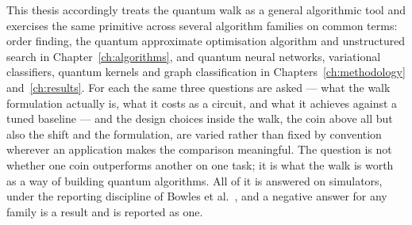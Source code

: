 This thesis accordingly treats the quantum walk as a general algorithmic
tool and exercises the same primitive across several algorithm families on
common terms: order finding, the quantum approximate optimisation algorithm
and unstructured search in Chapter~\ref{ch:algorithms}, and quantum neural
networks, variational classifiers, quantum kernels and graph classification
in Chapters~\ref{ch:methodology} and~\ref{ch:results}. For each the same
three questions are asked --- what the walk formulation actually is, what it
costs as a circuit, and what it achieves against a tuned baseline --- and
the design choices inside the walk, the coin above all but also the shift
and the formulation, are varied rather than fixed by convention wherever an
application makes the comparison meaningful. The question is not whether one
coin outperforms another on one task; it is what the walk is worth as a way
of building quantum algorithms. All of it is answered on simulators, under
the reporting discipline of Bowles et al.~\cite{Bowles_2024}, and a negative
answer for any family is a result and is reported as one.

